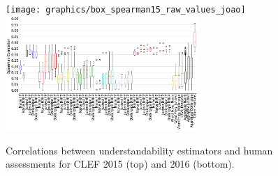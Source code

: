\begin{figure}[h!]
   \centering
   \texttt{[image: graphics/box\_spearman15\_raw\_values\_joao]}\vspace{-7pt}
      \includegraphics[width=0.65\textwidth]{graphics/box_spearman16_raw_values}
   \caption{Correlations between understandability estimators and human assessments for CLEF 2015 (top) and 2016 (bottom).}
   \label{fig:boxplot_corr_docs}
   \vspace{-10pt}
\end{figure}

%



